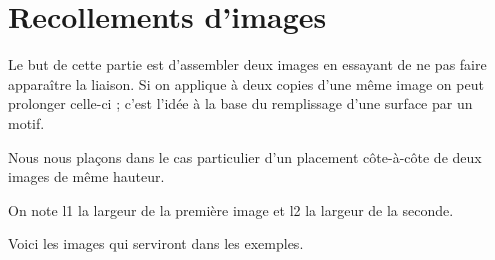 \section{Recollements d'images}
Le but de cette partie est d'assembler deux images en essayant de ne pas faire apparaître la liaison.
Si on applique à deux copies d'une même image on peut prolonger celle-ci ; c'est l'idée à la base du remplissage d'une surface par un motif.

Nous nous plaçons dans le cas particulier d'un placement côte-à-côte de deux images de même hauteur.

On note l1 la largeur de la première image et l2 la largeur de la seconde.

\begin{center}
\end{center}

Voici les images qui serviront dans les exemples.

